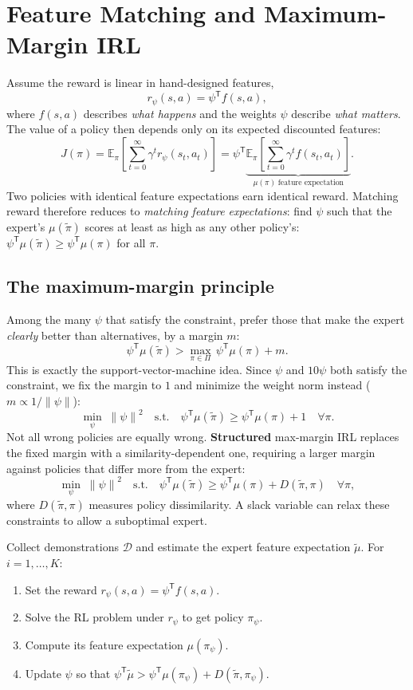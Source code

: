 \documentclass[11pt, oneside]{book}
\newcommand{\E}{\mathbb{E}}              %
\newcommand{\norm}[1]{\left\lVert #1 \right\rVert}
\newcommand{\T}{^{\mathsf{T}}}           %
\newcommand{\dataset}{\mathcal{D}}       %
\begin{document}
\section{Feature Matching and Maximum-Margin IRL}

Assume the reward is linear in hand-designed features,
\[
  r_\psi(s,a) = \psi\T f(s,a),
\]
where $f(s,a)$ describes \emph{what happens} and the weights $\psi$ describe \emph{what
matters}. The value of a policy then depends only on its expected discounted features:
\[
  J(\pi) = \E_\pi\!\left[\sum_{t=0}^\infty \gamma^t r_\psi(s_t,a_t)\right]
         = \psi\T \underbrace{\E_\pi\!\left[\sum_{t=0}^\infty \gamma^t f(s_t,a_t)\right]}_{\mu(\pi)\;\text{feature expectation}}.
\]
Two policies with identical feature expectations earn identical reward. Matching reward
therefore reduces to \emph{matching feature expectations}: find $\psi$ such that the
expert's $\mu(\tilde\pi)$ scores at least as high as any other policy's:
$\psi\T \mu(\tilde\pi) \ge \psi\T \mu(\pi)$ for all $\pi$.

\subsection{The maximum-margin principle}

Among the many $\psi$ that satisfy the constraint, prefer those that make the expert
\emph{clearly} better than alternatives, by a margin $m$:
\[
  \psi\T \mu(\tilde\pi) > \max_{\pi\in\Pi}\, \psi\T \mu(\pi) + m.
\]
This is exactly the support-vector-machine idea. Since $\psi$ and $10\psi$ both satisfy
the constraint, we fix the margin to $1$ and minimize the weight norm instead
($m \propto 1/\norm{\psi}$):
\[
  \min_\psi\; \norm{\psi}^2 \quad\text{s.t.}\quad
  \psi\T \mu(\tilde\pi) \ge \psi\T \mu(\pi) + 1 \quad \forall \pi.
\]
Not all wrong policies are equally wrong. \textbf{Structured} max-margin IRL replaces the
fixed margin with a similarity-dependent one, requiring a larger margin against policies
that differ more from the expert:
\[
  \min_\psi\; \norm{\psi}^2 \quad\text{s.t.}\quad
  \psi\T \mu(\tilde\pi) \ge \psi\T \mu(\pi) + D(\tilde\pi, \pi) \quad \forall \pi,
\]
where $D(\tilde\pi,\pi)$ measures policy dissimilarity. A slack variable can relax these
constraints to allow a suboptimal expert.

\begin{thmbox}[title={Maximum-margin IRL loop}]
Collect demonstrations $\dataset$ and estimate the expert feature expectation
$\tilde\mu$. For $i = 1,\dots,K$:
\begin{enumerate}
  \item Set the reward $r_\psi(s,a) = \psi\T f(s,a)$.
  \item Solve the RL problem under $r_\psi$ to get policy $\pi_\psi$.
  \item Compute its feature expectation $\mu(\pi_\psi)$.
  \item Update $\psi$ so that $\psi\T\tilde\mu > \psi\T\mu(\pi_\psi) + D(\tilde\pi,\pi_\psi)$.
\end{enumerate}
\end{thmbox}
\end{document}
